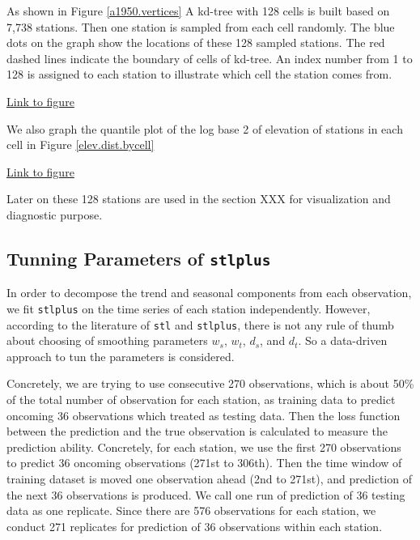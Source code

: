 As shown in Figure \href{../plots/vertices.a1950.pdf}{\ref*{a1950.vertices}}
A kd-tree with 128 cells is built based on 7,738 stations. Then one station is 
sampled from each cell randomly. The blue dots on the graph show the locations 
of these 128 sampled stations. The red dashed lines indicate the boundary of cells 
of kd-tree. An index number from 1 to 128 is assigned to each station to 
illustrate which cell the station comes from. 

\begin{framed}
\begin{center}
  \href{../plots/vertices.a1950.pdf}{Link to figure}
  \label{a1950.vertices}
\end{center}
\end{framed}

We also graph the quantile plot of the log base 2 of elevation of stations in each
cell in Figure \href{../plots/elev.dist.bycell.pdf}{\ref*{elev.dist.bycell}}

\begin{framed}
\begin{center}
  \href{../plots/elev.dist.bycell.pdf}{Link to figure}
  \label{elev.dist.bycell}
\end{center}
\end{framed}

Later on these 128 stations are used in the section XXX for visualization and 
diagnostic purpose.

\subsection{Tunning Parameters of \texttt{stlplus}}

In order to decompose the trend and seasonal components from each observation, we 
fit \texttt{stlplus} on the time series of each station independently. However,
according to the literature of \texttt{stl} and \texttt{stlplus}, there is not 
any rule of thumb about choosing of smoothing parameters $w_s$, $w_t$, $d_s$, and 
$d_t$. So a data-driven approach to tun the parameters is considered. 

Concretely, we are trying to use consecutive 270 observations, which is about 
50\% of the total number of observation for each station, as training 
data to predict oncoming 36 observations which treated as testing data. Then the 
loss function between the prediction and the true observation is calculated to 
measure the prediction ability. Concretely, for 
each station, we use the first 270 observations to predict 36 oncoming 
observations (271st to 306th). Then the time window of training dataset is moved 
one observation ahead (2nd to 271st), and prediction of the next 36 observations 
is produced. We call one run of prediction of 36 testing data as one replicate. 
Since there are 576 observations for each station, we conduct 271 replicates for 
prediction of 36 observations within each station.

